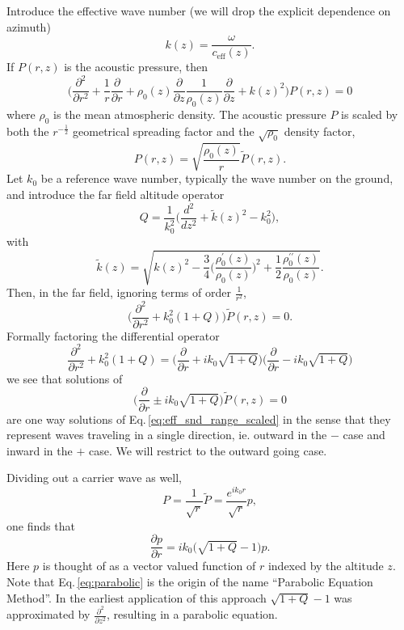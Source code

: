 Introduce the effective wave number (we will drop the explicit dependence on azimuth) 
\[
k(z)=\frac{\omega}{c_{\text{eff}}(z)}.
\]
If $P(r,z)$ is the acoustic pressure, then 
\begin{equation}\label{eq:eff_snd_helmholtz}
\Big(
\frac{\partial^2}{\partial r^2}+\frac{1}{r}\frac{\partial}{\partial r}
+
\rho_0(z)\frac{\partial}{\partial z}\frac{1}{\rho_0(z)}\frac{\partial}{\partial z}
+
k(z)^2
\Big)P(r,z)=0
\end{equation}
where $\rho_0$ is the mean atmospheric density. The acoustic pressure $P$ is scaled by both the $r^{-\frac{1}{2}}$ geometrical spreading factor and the $\sqrt{\rho_0}$ density factor, 
\begin{equation}\label{eq:scaled_P}
P(r,z)=\sqrt{\frac{\rho_0(z)}{r}}\tilde P(r,z).
\end{equation}
Let $k_0$ be a reference wave number, typically the wave number on the ground, and introduce the far field altitude operator 
\[
Q=\frac{1}{k_0^2}\Big(\frac{d^2}{d z^2}+\tilde k(z)^2-k_0^2\Big),
\]
with 
\begin{equation}\label{eq:wavenumber}
\tilde k(z)
=
\sqrt{k(z)^2-\frac{3}{4}\big(\frac{\rho_0^\prime(z)}{\rho_0(z)}\big)^2
+
\frac{1}{2}\frac{\rho_0^{\prime\prime}(z)}{\rho_0(z)}}.
\end{equation}
Then, in the far field, ignoring terms of order $\frac{1}{r^2}$, 
\begin{equation}\label{eq:eff_snd_range_scaled}
\Big(\frac{\partial^2}{\partial r^2}+k_0^2(1+Q)\Big)\tilde P(r,z)=0.
\end{equation}
Formally factoring the differential operator
\[
\frac{\partial^2}{\partial r^2}+k_0^2(1+Q)
=
\Big(\frac{\partial}{\partial r}+ik_0\sqrt{1+Q}\Big)\Big(\frac{\partial}{\partial r}-ik_0\sqrt{1+Q}\Big)
\]
we see that solutions of 
\[
\Big(\frac{\partial}{\partial r}\pm ik_0\sqrt{1+Q}\Big) \tilde P(r,z)=0
\]
are one way solutions of Eq.\,\ref{eq:eff_snd_range_scaled} in the sense that they represent waves traveling in a single direction, ie. outward in the $-$ case and inward in the $+$ case. We will restrict to the outward going case. 

Dividing out a carrier wave as well,
\[
P =\frac{1}{\sqrt{r}} \tilde P =\frac{e^{ik_0r}}{\sqrt{r}} p,
\]
one finds that 
\begin{equation}\label{eq:parabolic}
\frac{\partial p}{\partial r}=ik_0\big(\sqrt{1+Q}-1\big)p. 
\end{equation}
Here $p$ is thought of as a vector valued function of $r$ indexed by the altitude $z$. Note that Eq.\,\ref{eq:parabolic} is the origin of the name ``Parabolic Equation Method''. In the earliest application of this approach $\sqrt{1+Q}-1$ was approximated by $\frac{\partial ^2}{\partial z^2}$, resulting in a parabolic equation. 

